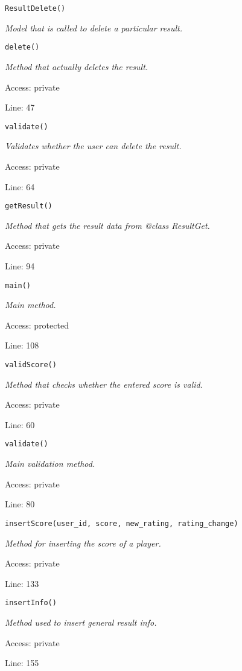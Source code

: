 \texttt{ResultDelete()}

{\scriptsize
\textit{Model that is called to delete a particular result.}

}

\texttt{delete()}

{\scriptsize
\textit{Method that actually deletes the result.}

Access: private

Line: 47

}

\texttt{validate()}

{\scriptsize
\textit{Validates whether the user can delete the result.}

Access: private

Line: 64

}

\texttt{getResult()}

{\scriptsize
\textit{Method that gets the result data from @class ResultGet.}

Access: private

Line: 94

}

\texttt{main()}

{\scriptsize
\textit{Main method.}

Access: protected

Line: 108

}

\texttt{validScore()}

{\scriptsize
\textit{Method that checks whether the entered score is valid.}

Access: private

Line: 60

}

\texttt{validate()}

{\scriptsize
\textit{Main validation method.}

Access: private

Line: 80

}

\texttt{insertScore(user\_id, score, new\_rating, rating\_change)}

{\scriptsize
\textit{Method for inserting the score of a player.}

Access: private

Line: 133

}

\texttt{insertInfo()}

{\scriptsize
\textit{Method used to insert general result info.}

Access: private

Line: 155

}

